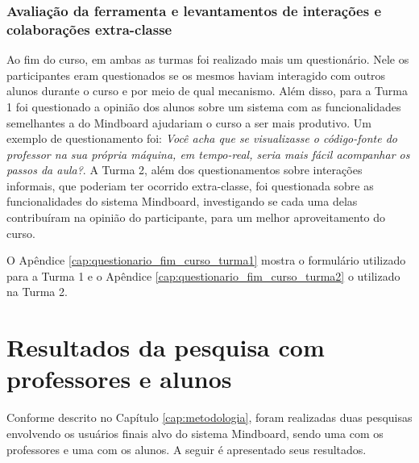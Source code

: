 \subsection{Avaliação da ferramenta e levantamentos de interações e colaborações extra-classe}

Ao fim do curso, em ambas as turmas foi realizado mais um questionário. Nele os participantes eram questionados se os mesmos haviam interagido com outros alunos durante o curso e por meio de qual mecanismo. Além disso, para a Turma 1 foi questionado a opinião dos alunos sobre um sistema com as funcionalidades semelhantes a do Mindboard ajudariam o curso a ser mais produtivo. Um exemplo de questionamento foi: \emph{Você acha que se visualizasse o código-fonte do professor na sua própria máquina, em tempo-real, seria mais fácil acompanhar os passos da aula?}. A Turma 2, além dos questionamentos sobre interações informais, que poderiam ter ocorrido extra-classe, foi questionada sobre as funcionalidades do sistema Mindboard, investigando se cada uma delas contribuíram na opinião do participante, para um melhor aproveitamento do curso.

O Apêndice \ref{cap:questionario_fim_curso_turma1} mostra o formulário utilizado para a Turma 1 e o Apêndice \ref{cap:questionario_fim_curso_turma2} o utilizado na Turma 2.






\chapter{Resultados da pesquisa com professores e alunos}
\label{cap:resultados_pesquisa_professores_alunos}

Conforme descrito no Capítulo \ref{cap:metodologia}, foram realizadas duas pesquisas envolvendo os usuários finais alvo do sistema Mindboard, sendo uma com os professores e uma com os alunos. A seguir é apresentado seus resultados.




